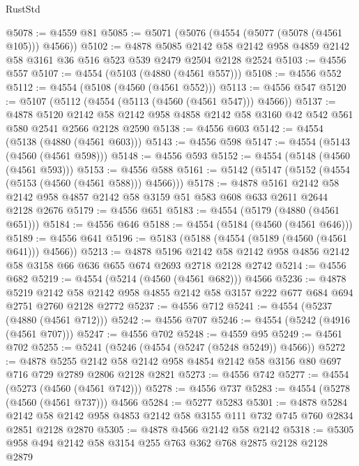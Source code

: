 \begin{lexlean}{RustStd}
\begin{coremodule}
{\begin{coremodule}
{{{{{{{{{{{{{{{{@5078 := @4559 @81
@5085 := @5071 (@5076 (@4554 (@5077 (@5078 (@4561 @105))) @4566))
@5102 := @4878
    @5085
    @2142
    @58
    @2142
    @958
    @4859
    @2142
    @58
    @3161
    @36
    @516
    @523
    @539
    @2479
    @2504
    @2128
    @2524
@5103 := @4556 @557
@5107 := @4554 (@5103 (@4880 (@4561 @557)))
@5108 := @4556 @552
@5112 := @4554 (@5108 (@4560 (@4561 @552)))
@5113 := @4556 @547
@5120 := @5107 (@5112 (@4554 (@5113 (@4560 (@4561 @547))) @4566))
@5137 := @4878
    @5120
    @2142
    @58
    @2142
    @958
    @4858
    @2142
    @58
    @3160
    @42
    @542
    @561
    @580
    @2541
    @2566
    @2128
    @2590
@5138 := @4556 @603
@5142 := @4554 (@5138 (@4880 (@4561 @603)))
@5143 := @4556 @598
@5147 := @4554 (@5143 (@4560 (@4561 @598)))
@5148 := @4556 @593
@5152 := @4554 (@5148 (@4560 (@4561 @593)))
@5153 := @4556 @588
@5161 := @5142 (@5147 (@5152 (@4554 (@5153 (@4560 (@4561 @588))) @4566)))
@5178 := @4878
    @5161
    @2142
    @58
    @2142
    @958
    @4857
    @2142
    @58
    @3159
    @51
    @583
    @608
    @633
    @2611
    @2644
    @2128
    @2676
@5179 := @4556 @651
@5183 := @4554 (@5179 (@4880 (@4561 @651)))
@5184 := @4556 @646
@5188 := @4554 (@5184 (@4560 (@4561 @646)))
@5189 := @4556 @641
@5196 := @5183 (@5188 (@4554 (@5189 (@4560 (@4561 @641))) @4566))
@5213 := @4878
    @5196
    @2142
    @58
    @2142
    @958
    @4856
    @2142
    @58
    @3158
    @66
    @636
    @655
    @674
    @2693
    @2718
    @2128
    @2742
@5214 := @4556 @682
@5219 := @4554 (@5214 (@4560 (@4561 @682))) @4566
@5236 := @4878
    @5219
    @2142
    @58
    @2142
    @958
    @4855
    @2142
    @58
    @3157
    @222
    @677
    @684
    @694
    @2751
    @2760
    @2128
    @2772
@5237 := @4556 @712
@5241 := @4554 (@5237 (@4880 (@4561 @712)))
@5242 := @4556 @707
@5246 := @4554 (@5242 (@4916 (@4561 @707)))
@5247 := @4556 @702
@5248 := @4559 @95
@5249 := @4561 @702
@5255 := @5241 (@5246 (@4554 (@5247 (@5248 @5249)) @4566))
@5272 := @4878
    @5255
    @2142
    @58
    @2142
    @958
    @4854
    @2142
    @58
    @3156
    @80
    @697
    @716
    @729
    @2789
    @2806
    @2128
    @2821
@5273 := @4556 @742
@5277 := @4554 (@5273 (@4560 (@4561 @742)))
@5278 := @4556 @737
@5283 := @4554 (@5278 (@4560 (@4561 @737))) @4566
@5284 := @5277 @5283
@5301 := @4878
    @5284
    @2142
    @58
    @2142
    @958
    @4853
    @2142
    @58
    @3155
    @111
    @732
    @745
    @760
    @2834
    @2851
    @2128
    @2870
@5305 := @4878 @4566 @2142 @58 @2142
@5318 := @5305 @958 @494 @2142 @58 @3154 @255 @763 @362 @768 @2875 @2128 @2128 @2879
}}}}}}}}}}}}}}}}
\end{coremodule}}
\end{coremodule}
\end{lexlean}
